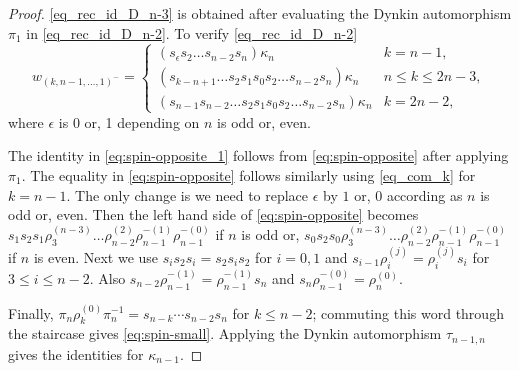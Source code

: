 \documentclass[a4paper]{amsart}
\theoremstyle{remark}
\numberwithin{equation}{section}
\begin{document}
\begin{proof}
\eqref{eq_rec_id_D_n-3} is obtained after evaluating the Dynkin automorphism $\pi_1$ in \eqref{eq_rec_id_D_n-2}. To verify \eqref{eq_rec_id_D_n-2} 
\begin{equation}\label{eq_com_k}
w_{(k,n-1,\dots,1)^-}= 
\begin{cases} 
(s_{\epsilon} s_2 \dots s_{n-2} s_{n})\kappa_{n} & k=n-1, \\ 
(s_{k-n+1} \dots s_2 s_1 s_0 s_2 \dots s_{n-2} s_{n})\kappa_{n} & n \le k \le 2n-3, \\ 
(s_{n-1} s_{n-2}  \dots s_2s_1 s_0 s_2 \dots s_{n-2} s_{n})\kappa_{n} & k=2n-2, 
\end{cases}   
\end{equation}
where $\epsilon$ is $0$ or, 1 depending on $n$ is odd or, even. 

 The identity in \eqref{eq:spin-opposite_1} follows from \eqref{eq:spin-opposite} after applying $\pi_1$. The equality in \eqref{eq:spin-opposite} follows similarly using \eqref{eq_com_k} for $k=n-1$. The only change is we need to replace $\epsilon$ by $1$ or, 0  according as $n$ is odd or, even. Then the left hand side of \eqref{eq:spin-opposite}  becomes $s_1s_2s_1\rho_3^{(n-3)}\dots\rho_{n-2}^{(2)}\rho_{n-1}^{-(1)}\rho_{n-1}^{-(0)}$ if $n$ is odd or, $s_0s_2s_0\rho_3^{(n-3)}\dots\rho_{n-2}^{(2)}\rho_{n-1}^{-(1)}\rho_{n-1}^{-(0)}$ if $n$ is even. Next we use $s_is_2s_i=s_2s_is_2$ for $i=0,1$ and $s_{i-1}\rho_i^{(j)}=\rho_i^{(j)}s_i$ for $3\leq i\le n-2$. Also  $s_{n-2}\rho_{n-1}^{-(1)}=\rho_{n-1}^{-(1)}s_n$ and $s_n\rho_{n-1}^{-(0)}=\rho_n^{(0)}$.  


Finally,
$\pi_n\rho_k^{(0)}\pi_n^{-1}=s_{n-k}\cdots s_{n-2}s_n$ for
$k\leq n-2$; commuting this word through the staircase gives
\eqref{eq:spin-small}.  Applying the Dynkin automorphism $\tau_{n-1,n}$ gives the identities for $\kappa_{n-1}$.
\end{proof}
\end{document}
